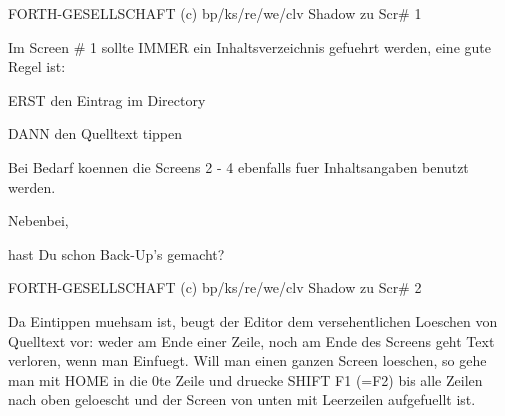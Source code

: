                                          
                                         
                                         
                                         
                                         
                                         
                                         
                                         
                                         
                                         
                                         
                                         
FORTH-GESELLSCHAFT  (c) bp/ks/re/we/clv 
Shadow zu Scr# 1                         
                                         
Im Screen # 1 sollte IMMER ein           
Inhaltsverzeichnis gefuehrt werden,      
eine gute Regel ist:                     
                                         
 ERST den Eintrag im Directory           
                                         
 DANN den Quelltext tippen               
                                         
Bei Bedarf koennen die Screens 2 - 4     
ebenfalls fuer Inhaltsangaben benutzt    
werden.                                  
                                         
                                         
                                         
                                         
                                         
                                         
                                         
              Nebenbei,                  
                                         
    hast Du schon Back-Up's gemacht?     
                                         
FORTH-GESELLSCHAFT  (c) bp/ks/re/we/clv 
Shadow zu Scr# 2                         
                                         
Da Eintippen muehsam ist,                
beugt der Editor dem versehentlichen     
Loeschen von Quelltext vor:              
weder am Ende einer Zeile,               
noch am Ende des Screens geht Text       
verloren, wenn man Einfuegt.             
Will man einen ganzen Screen loeschen,   
so gehe man mit HOME in die 0te Zeile    
und druecke SHIFT F1 (=F2) bis alle      
Zeilen nach oben geloescht und der       
Screen von unten mit Leerzeilen          
aufgefuellt ist.                         
                                         
